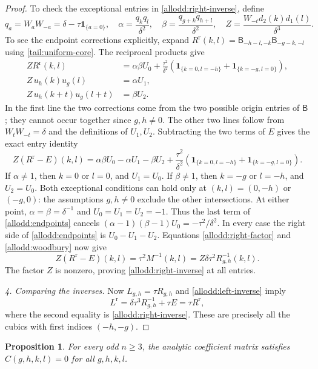 \documentclass[11pt]{article}
\numberwithin{equation}{section}
\newtheorem{proposition}[theorem]{Proposition}
\theoremstyle{definition}
\theoremstyle{remark}
\newcommand{\ind}[1]{\mathbf1_{\{#1\}}}
\begin{document}
\begin{proof}
To check the exceptional entries in
\eqref{allodd:right-inverse}, define
\[
 q_a=W_aW_{-a}=\delta-\tau\ind{a=0},\quad
 \alpha=\frac{q_kq_l}{\delta^2},\quad
 \beta=\frac{q_{g+k}q_{h+l}}{\delta^2},\quad
 Z=\frac{W_{-t}d_2(k)d_1(l)}{\delta^3}.
\]
To see the endpoint corrections explicitly, expand
$R^{\mathrm r}(k,l)=\mathsf B_{-h-l,-k}\mathsf B_{-g-k,-l}$
using \eqref{tail:uniform-core}. The reciprocal products give
\[
\begin{aligned}
 ZR^{\mathrm r}(k,l)
   &=\alpha\beta U_0+\frac{\tau^2}{\delta^2}
       (\ind{k=0,l=-h}+\ind{k=-g,l=0}),\\
 Z\,u_h(k)u_g(l)&=\alpha U_1,\\
 Z\,u_h(k+t)u_g(l+t)&=\beta U_2.
\end{aligned}
\]
In the first line the two corrections come from the two possible
origin entries of $\mathsf B$; they cannot occur together since
$g,h\ne0$. The other two lines follow from $W_tW_{-t}=\delta$
and the definitions of $U_1,U_2$.
Subtracting the two terms of $E$ gives the exact entry identity
\begin{equation}\label{allodd:endpoints}
 Z(R^{\mathrm r}-E)(k,l)
  =\alpha\beta U_0-\alpha U_1-\beta U_2
     +\frac{\tau^2}{\delta^2}
        (\ind{k=0,l=-h}+\ind{k=-g,l=0}).
\end{equation}
If $\alpha\ne1$, then $k=0$ or $l=0$, and $U_1=U_0$.
If $\beta\ne1$, then $k=-g$ or $l=-h$, and $U_2=U_0$.
Both exceptional conditions can hold only at $(k,l)=(0,-h)$
or $(-g,0)$: the assumptions $g,h\ne0$ exclude the other
intersections.  At either point,
$\alpha=\beta=\delta^{-1}$ and $U_0=U_1=U_2=-1$.
Thus the last term of \eqref{allodd:endpoints} cancels
$(\alpha-1)(\beta-1)U_0=-\tau^2/\delta^2$.
In every case the right side of \eqref{allodd:endpoints} is
$U_0-U_1-U_2$.  Equations \eqref{allodd:right-factor} and
\eqref{allodd:woodbury} now give
\[
 Z(R^{\mathrm r}-E)(k,l)
   =\tau^2M^{-1}(k,l)
   =Z\delta\tau^2R_{g,h}^{-1}(k,l).
\]
The factor $Z$ is nonzero, proving
\eqref{allodd:right-inverse} at all entries.

\emph{4. Comparing the inverses.} Now $L_{g,h}=\tau R_{g,h}$ and
\eqref{allodd:left-inverse} imply
\[
 L^{\mathrm r}=\delta\tau^3R_{g,h}^{-1}+\tau E
             =\tau R^{\mathrm r},
\]
where the second equality is \eqref{allodd:right-inverse}.
These are precisely all the cubics with first indices $(-h,-g)$.
\end{proof}

\begin{proposition}\label{allodd:all-cubics}
For every odd $n\ge3$, the analytic coefficient matrix satisfies
$C(g,h,k,l)=0$ for all $g,h,k,l$.
\end{proposition}
\end{document}
